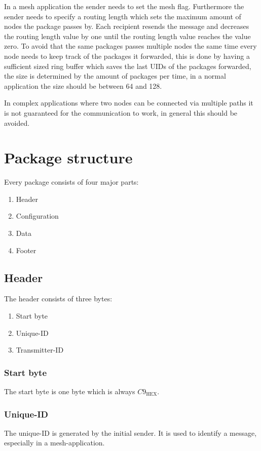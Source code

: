 \documentclass{report}
\begin{document}
    In a mesh application the sender needs to set the mesh flag.
    Furthermore the sender needs to specify a routing length which sets the maximum amount of
    nodes the package passes by.
    Each recipient resends the message and decreases the routing length value by one
    until the routing length value reaches the value zero. To avoid that the same
    packages passes multiple nodes the same time every node
    needs to keep track of the packages it forwarded, this is done by having a
    sufficient sized ring buffer which saves the last UIDs of the packages forwarded,
    the size is determined by the amount of packages per time, in a normal application
    the size should be between 64 and 128.

    In complex applications where two nodes can be connected via multiple
    paths it is not guaranteed for the communication to work, in general this should be
    avoided.

  \section{Package structure}
    Every package consists of four major parts:
    \begin{enumerate}
      \item Header
      \item Configuration
      \item Data
      \item Footer
    \end{enumerate}

  \subsection{Header}
    The header consists of three bytes:
    \begin{enumerate}
      \item Start byte
      \item Unique-ID
      \item Transmitter-ID
    \end{enumerate}

    \subsubsection{Start byte}
    The start byte is one byte which is always ${C9}_\text{HEX}$.

    \subsubsection{Unique-ID}
     The unique-ID is generated by the initial sender. It is used to identify a
     message, especially in a mesh-application.
\end{document}
